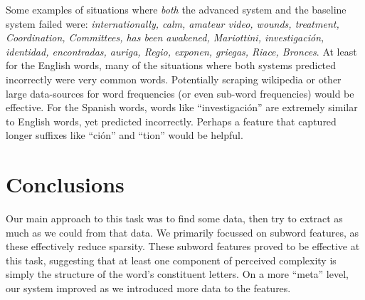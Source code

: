 \documentclass[11pt,a4paper]{article}
\begin{document}
Some examples of situations where \emph{both} the advanced system and the baseline system failed were: \emph{internationally, calm, amateur video, wounds, treatment, Coordination, Committees, has been awakened, Mariottini, investigación, identidad, encontradas, auriga, Regio, exponen, griegas, Riace, Bronces}. At least for the English words, many of the situations where both systems predicted incorrectly were very common words. Potentially scraping wikipedia or other large data-sources for word frequencies (or even sub-word frequencies) would be effective. For the Spanish words, words like \enquote{investigación} are extremely similar to English words, yet predicted incorrectly. Perhaps a feature that captured longer suffixes like \enquote{ción} and \enquote{tion} would be helpful.

\section{Conclusions}

Our main approach to this task was to find some data, then try to extract as much as we could from that data. We primarily focussed on subword features, as these effectively reduce sparsity. These subword features proved to be effective at this task, suggesting that at least one component of perceived complexity is simply the structure of the word's constituent letters. On a more \enquote{meta} level, our system improved as we introduced more data to the features.

%
%



\end{document}
